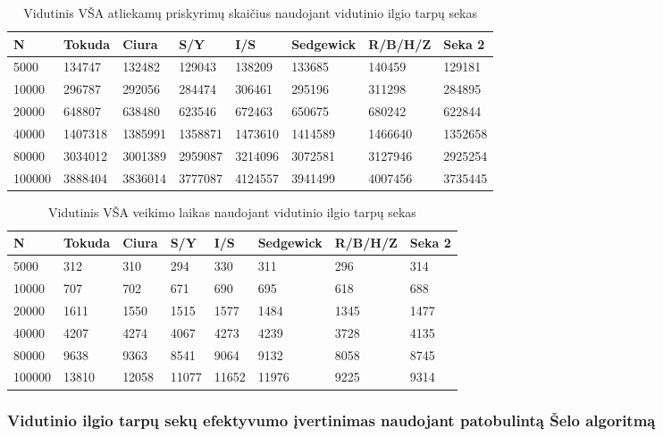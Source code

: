 \documentclass{VUMIFInfKursinis}
\begin{document}
\begin{table}[H]
  \caption{Vidutinis VŠA atliekamų priskyrimų skaičius naudojant vidutinio ilgio tarpų sekas}
  \begin{tabular}{|l|l|l|l|l|l|l|l|}
  \hline
  N      & Tokuda  & Ciura   & S/Y     & I/S     & Sedgewick & R/B/H/Z & Seka 2     \\ \hline
  5000   & 134747  & 132482  & 129043  & 138209  & 133685    & 140459  & 129181  \\ \hline
  10000  & 296787  & 292056  & 284474  & 306461  & 295196    & 311298  & 284895  \\ \hline
  20000  & 648807  & 638480  & 623546  & 672463  & 650675    & 680242  & 622844  \\ \hline
  40000  & 1407318 & 1385991 & 1358871 & 1473610 & 1414589   & 1466640 & 1352658 \\ \hline
  80000  & 3034012 & 3001389 & 2959087 & 3214096 & 3072581   & 3127946 & 2925254 \\ \hline
  100000 & 3888404 & 3836014 & 3777087 & 4124557 & 3941499   & 4007456 & 3735445 \\ \hline
  \end{tabular}
\end{table}

\begin{table}[H]
  \caption{Vidutinis VŠA veikimo laikas naudojant vidutinio ilgio tarpų sekas}
  \begin{tabular}{|l|l|l|l|l|l|l|l|}
  \hline
  N      & Tokuda & Ciura & S/Y   & I/S   & Sedgewick & R/B/H/Z & Seka 2  \\ \hline
  5000   & 312    & 310   & 294   & 330   & 311       & 296     & 314  \\ \hline
  10000  & 707    & 702   & 671   & 690   & 695       & 618     & 688  \\ \hline
  20000  & 1611   & 1550  & 1515  & 1577  & 1484      & 1345    & 1477 \\ \hline
  40000  & 4207   & 4274  & 4067  & 4273  & 4239      & 3728    & 4135 \\ \hline
  80000  & 9638   & 9363  & 8541  & 9064  & 9132      & 8058    & 8745 \\ \hline
  100000 & 13810  & 12058 & 11077 & 11652 & 11976     & 9225    & 9314 \\ \hline
  \end{tabular}
  \end{table}

\subsubsection{Vidutinio ilgio tarpų sekų efektyvumo įvertinimas naudojant patobulintą Šelo algoritmą}
\end{document}
